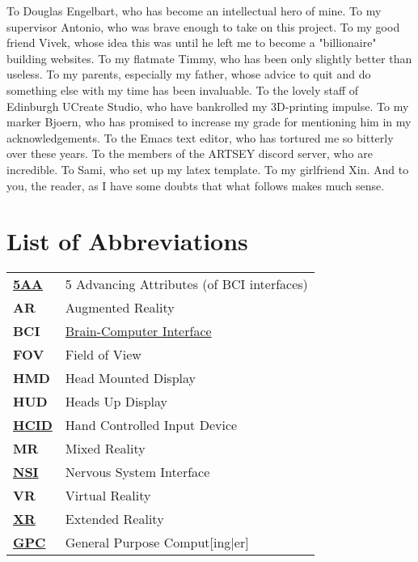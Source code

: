 \documentclass[logo,bsc,singlespacing,parskip]{infthesis}
\begin{document}
\begin{preliminary}
\begin{acknowledgements}
To Douglas Engelbart, who has become an intellectual hero of mine.
To my supervisor Antonio, who was brave enough to take on this project.
To my good friend Vivek, whose idea this was until he left me to become a "billionaire" building websites.
To my flatmate Timmy, who has been only slightly better than useless.
To my parents, especially my father, whose advice to quit and do something else with my time has been invaluable.
To the lovely staff of Edinburgh UCreate Studio, who have bankrolled my 3D-printing impulse.
To my marker Bjoern, who has promised to increase my grade for mentioning him in my acknowledgements.
To the Emacs text editor, who has tortured me so bitterly over these years.
To the members of the ARTSEY discord server, who are incredible.
To Sami, who set up my latex template.
To my girlfriend Xin.
And to you, the reader, as I have some doubts that what follows makes much sense.
\end{acknowledgements}

\iffalse %

\part{List of Abbreviations}
\label{sec:org394ffba}
\fi
\chapter*{List of Abbreviations}
\label{sec:org51324e5}
\begin{center}
\begin{tabular}{ll}
\textbf{\hyperref[org85f90e8]{5AA}} & 5 Advancing Attributes (of BCI interfaces)\\
\textbf{AR} & Augmented Reality\\
\textbf{BCI} & \hyperref[orgeddbcd6]{Brain-Computer Interface}\\
\textbf{FOV} & Field of View\\
\textbf{HMD} & Head Mounted Display\\
\textbf{HUD} & Heads Up Display\\
\textbf{\hyperref[orgc00eca5]{HCID}} & Hand Controlled Input Device\\
\textbf{MR} & Mixed Reality\\
\textbf{\hyperref[org79fc546]{NSI}} & Nervous System Interface\\
\textbf{VR} & Virtual Reality\\
\textbf{\hyperref[org1d567af]{XR}} & Extended Reality\\
\textbf{\hyperref[orgc6765d5]{GPC}} & General Purpose Comput[ing\(\vert{}\)er]\\
\end{tabular}

\end{center}

\setcounter{tocdepth}{1}
\tableofcontents
{}
\listoffigures
\listoftables
\end{preliminary}
\end{document}
